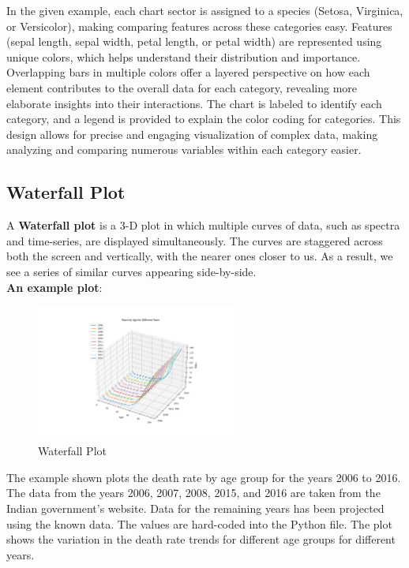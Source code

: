 \documentclass{article}
\begin{document}
In the given example, each chart sector is assigned to a species (Setosa, Virginica, or Versicolor), making comparing features across these categories easy. Features (sepal length, sepal width, petal length, or petal width) are represented using unique colors, which helps understand their distribution and importance. Overlapping bars in multiple colors offer a layered perspective on how each element contributes to the overall data for each category, revealing more elaborate insights into their interactions. The chart is labeled to identify each category, and a legend is provided to explain the color coding for categories. This design allows for precise and engaging visualization of complex data, making analyzing and comparing numerous variables within each category easier.

\subsection{Waterfall Plot}

A \textbf{Waterfall plot} is a 3-D plot in which multiple curves of data, such as spectra and time-series, are displayed simultaneously. The curves are staggered across both the screen and vertically, with the nearer ones closer to us. As a result, we see a series of similar curves appearing side-by-side.
\\[5pt]
\textbf{An example plot}:
\begin{figure}[H]
    \centering
    \includegraphics[width=0.6\textwidth]{assets/plots/waterfall_plot.png}
    \caption{Waterfall Plot}
    \label{fig:waterfall_plot}
\end{figure}

The example shown plots the death rate by age group for the years 2006 to 2016. The data from the years 2006, 2007, 2008, 2015, and 2016 are taken from the Indian government's website. Data for the remaining years has been projected using the known data. The values are hard-coded into the Python file. The plot shows the variation in the death rate trends for different age groups for different years.
\end{document}
